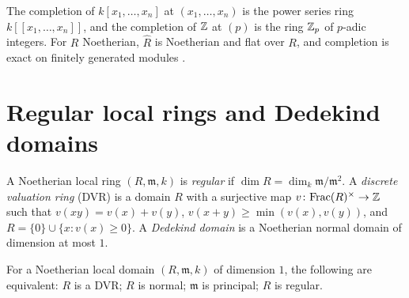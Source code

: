 \begin{example}\label{commutative-algebra:example-completions}
The completion of $k[x_1, \ldots, x_n]$ at $(x_1, \ldots, x_n)$ is the power series ring $k[[x_1, \ldots, x_n]]$, and the completion of
$\mathbb{Z}$ at $(p)$ is the ring $\mathbb{Z}_p$ of $p$-adic integers. For $R$ Noetherian, $\hat R$ is Noetherian and flat over $R$, and completion is
exact on finitely generated modules \cite[Chapter 10]{atiyah-macdonald}.
\end{example}

\section{Regular local rings and Dedekind domains}\label{commutative-algebra:section-regular}

\begin{definition}\label{commutative-algebra:definition-regular}
A Noetherian local ring $(R, \mathfrak{m}, k)$ is \emph{regular} if $\dim R = \dim_k\mathfrak{m}/\mathfrak{m}^2$. A \emph{discrete valuation ring}
(DVR) is a domain $R$ with a surjective map $v \colon \mathrm{Frac}(R)^\times \to \mathbb{Z}$ such that $v(xy) = v(x) + v(y)$,
$v(x + y) \geq \min(v(x), v(y))$, and $R = \{0\} \cup \{x : v(x) \geq 0\}$. A \emph{Dedekind domain} is a Noetherian normal domain of
dimension at most $1$.
\end{definition}

\begin{theorem}\label{commutative-algebra:theorem-dvr}
For a Noetherian local domain $(R, \mathfrak{m}, k)$ of dimension $1$, the following are equivalent: $R$ is a DVR; $R$ is normal; $\mathfrak{m}$
is principal; $R$ is regular.
\end{theorem}

